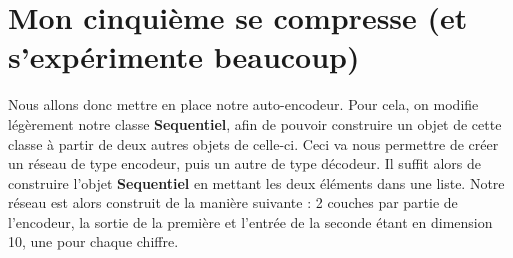 \documentclass{article}
\begin{document}
\section{Mon cinquième se compresse (et s'expérimente beaucoup)}
Nous allons donc mettre en place notre auto-encodeur. Pour cela, on modifie légèrement notre classe \textbf{Sequentiel}, afin de pouvoir construire un objet de cette classe à partir de deux autres objets de celle-ci.
Ceci va nous permettre de créer un réseau de type encodeur, puis un autre de type décodeur. Il suffit alors de construire l'objet \textbf{Sequentiel} en mettant les deux éléments dans une liste.
Notre réseau est alors construit de la manière suivante : 2 couches par partie de l'encodeur, la sortie de la première et l'entrée de la seconde étant en dimension 10, une pour chaque chiffre.
\end{document}
